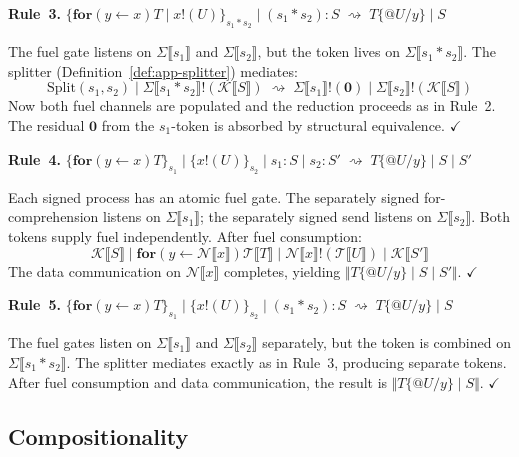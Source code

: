 \documentclass[11pt,a4paper]{article}
\makeatletter
\newcommand{\lsem}{\llbracket}
\newcommand{\rsem}{\rrbracket}
\newcommand{\Par}{\mathbin{|}}
\newcommand{\forc}{\mathbf{for}}
\newcommand{\send}[2]{#1 !\!\left( #2 \right)}
\newcommand{\recv}[3]{\forc\!\left( #1 \leftarrow #2 \right) #3}
\newcommand{\nil}{\mathbf{0}}
\newcommand{\quot}[1]{@#1}
\newcommand{\subst}[3]{#1\{#2 / #3\}}
\newcommand{\signed}[2]{\{#1\}_{#2}}
\newcommand{\comp}{\mathbin{*}}
\newcommand{\red}{\rightsquigarrow}
\makeatother
\begin{document}
\bigskip
\noindent
\textbf{Rule~3.}\;
$\signed{\recv{y}{x}{T} \Par \send{x}{U}}{s_1 \comp s_2}
\Par (s_1 \comp s_2) : S
\;\red\; \subst{T}{\quot{U}}{y} \Par S$

\medskip\noindent
The fuel gate listens on $\Sigma\lsem s_1 \rsem$ and
$\Sigma\lsem s_2 \rsem$, but the token lives on
$\Sigma\lsem s_1 \comp s_2 \rsem$.  The splitter
(Definition~\ref{def:app-splitter}) mediates:
\[
  \mathrm{Split}(s_1, s_2)
  \Par
  \send{\Sigma\lsem s_1 \comp s_2 \rsem}{
    \mathcal{K}\lsem S \rsem
  }
  \;\red\;
  \send{\Sigma\lsem s_1 \rsem}{\nil}
  \Par
  \send{\Sigma\lsem s_2 \rsem}{
    \mathcal{K}\lsem S \rsem
  }
\]
Now both fuel channels are populated and the reduction
proceeds as in Rule~2.  The residual $\nil$ from the
$s_1$-token is absorbed by structural equivalence.
\quad$\checkmark$

\bigskip
\noindent
\textbf{Rule~4.}\;
$\signed{\recv{y}{x}{T}}{s_1}
\Par \signed{\send{x}{U}}{s_2}
\Par s_1 : S \Par s_2 : S'
\;\red\; \subst{T}{\quot{U}}{y} \Par S \Par S'$

\medskip\noindent
Each signed process has an atomic fuel gate.  The
separately signed for-comprehension listens on
$\Sigma\lsem s_1 \rsem$; the separately signed send listens
on $\Sigma\lsem s_2 \rsem$.  Both tokens supply fuel
independently.  After fuel consumption:
\[
  \mathcal{K}\lsem S \rsem
  \Par
  \recv{y}{\mathcal{N}\lsem x \rsem}{
    \mathcal{T}\lsem T \rsem
  }
  \Par
  \send{\mathcal{N}\lsem x \rsem}{
    \mathcal{T}\lsem U \rsem
  }
  \Par
  \mathcal{K}\lsem S' \rsem
\]
The data communication on $\mathcal{N}\lsem x \rsem$
completes, yielding
$\Vert \subst{T}{\quot{U}}{y} \Par S \Par S' \Vert$.
\quad$\checkmark$

\bigskip
\noindent
\textbf{Rule~5.}\;
$\signed{\recv{y}{x}{T}}{s_1}
\Par \signed{\send{x}{U}}{s_2}
\Par (s_1 \comp s_2) : S
\;\red\; \subst{T}{\quot{U}}{y} \Par S$

\medskip\noindent
The fuel gates listen on $\Sigma\lsem s_1 \rsem$ and
$\Sigma\lsem s_2 \rsem$ separately, but the token is
combined on $\Sigma\lsem s_1 \comp s_2 \rsem$.  The splitter
mediates exactly as in Rule~3, producing separate tokens.
After fuel consumption and data communication, the result is
$\Vert \subst{T}{\quot{U}}{y} \Par S \Vert$.
\quad$\checkmark$

\subsection{Compositionality}
\label{app:compositionality}
\end{document}
